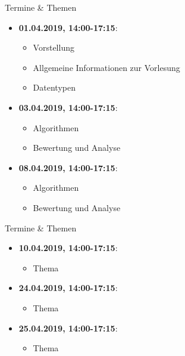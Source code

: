 \begin{frame}{Termine \& Themen}
	\begin{itemize}
		\item \textbf{01.04.2019, 14:00-17:15}:
		\begin{itemize}
			\item Vorstellung
			\item Allgemeine Informationen zur Vorlesung
			\item Datentypen
		\end{itemize}
		\item \textbf{03.04.2019, 14:00-17:15}:
		\begin{itemize}
			\item Algorithmen
			\item Bewertung und Analyse
		\end{itemize}
		\item \textbf{08.04.2019, 14:00-17:15}:
		\begin{itemize}
			\item Algorithmen
			\item Bewertung und Analyse
		\end{itemize}
	\end{itemize}
\end{frame}

\begin{frame}{Termine \& Themen}
	\begin{itemize}
		\item \textbf{10.04.2019, 14:00-17:15}:
		\begin{itemize}
			\item Thema
		\end{itemize}
		\item \textbf{24.04.2019, 14:00-17:15}:
		\begin{itemize}
			\item Thema
		\end{itemize}
		\item \textbf{25.04.2019, 14:00-17:15}:
		\begin{itemize}
			\item Thema
		\end{itemize}
	\end{itemize}
\end{frame}

